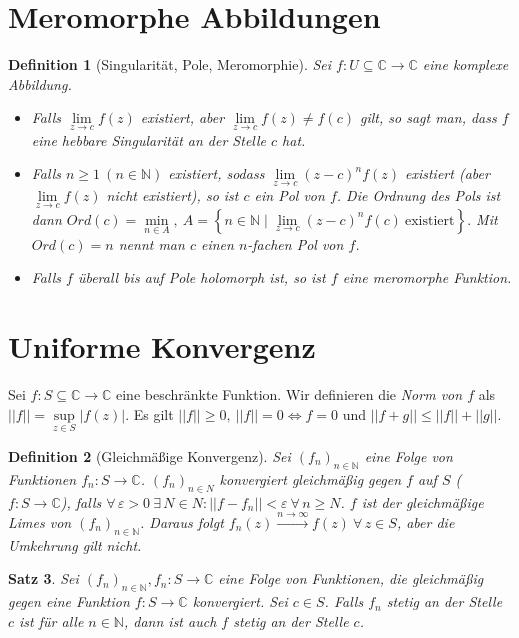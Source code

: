 \documentclass[a4paper,12pt]{book}
\renewcommand{\epsilon}{\varepsilon}
\theoremstyle{newthm}
\newtheorem{thm}{Satz}[section]
\theoremstyle{newdef}
\newtheorem{defn}[thm]{Definition}
\theoremstyle{newrem}
\newcommand{\N}{\mathbb{N}}
\newcommand{\C}{\mathbb{C}}
\begin{document}
	
	\section{Meromorphe Abbildungen}
		
		\begin{defn}[Singularität, Pole, Meromorphie]
			Sei $ f : U \subseteq \C \to \C $ eine komplexe Abbildung.
			\begin{itemize}
				\item Falls $ \lim\limits_{z \to c} f(z) $ existiert, aber $ \lim\limits_{z \to c} f(z) \neq f(c) $ gilt, so sagt man, dass $f$ eine \emph{hebbare Singularität} an der Stelle $c$ hat. 
				\item Falls $ n \geq 1\ (n \in \N) $ existiert, sodass $ \lim\limits_{z \to c} (z-c)^n f(z) $ existiert (aber $ \lim\limits_{z \to c} f(z) $ nicht existiert), so ist $c$ ein \emph{Pol} von $f$. Die \emph{Ordnung des Pols} ist dann $ Ord(c) = \min\limits_{n \in A},\ A = \left\{ n \in \N \mid \lim\limits_{z \to c}(z-c)^nf(c)\ \text{existiert} \right\}. $ Mit $ Ord(c) = n $ nennt man $c$ einen $n$-fachen Pol von $f$.
				\item Falls $ f $ überall bis auf Pole holomorph ist, so ist $f$ eine \emph{meromorphe Funktion}.
			\end{itemize}
		\end{defn}
		
	
	\section{Uniforme Konvergenz}
		
		Sei $ f: S \subseteq \C \to \C $ eine beschränkte Funktion. Wir definieren die \emph{Norm von $f$} als $ ||f||=\sup\limits_{z \in S} |f(z)| $. Es gilt $ ||f|| \geq 0,\ ||f||=0 \iff f=0 $ und $ ||f+g|| \leq ||f||+||g|| $. 
		
		\begin{defn}[Gleichmäßige Konvergenz]
			Sei $ (f_n)_{n \in \N} $ eine Folge von Funktionen $ f_n: S \to \C $. $ (f_n)_{n \in N} $ \emph{konvergiert gleichmäßig} gegen $f$ auf $S$ ($ f: S \to \C $), falls $ \forall\, \epsilon > 0 \ \exists\, N \in N: ||f-f_n|| < \epsilon \ \forall\, n \geq N $. $f$ ist der gleichmäßige Limes von $ (f_n)_{n \in \N} $. Daraus folgt $ f_n(z) \overset{n \to \infty}{\longrightarrow} f(z) \ \forall\, z \in S $, aber die Umkehrung gilt nicht.
		\end{defn}
		
		\begin{thm}
			Sei $ (f_n)_{n \in \N}, f_n:S \to \C $ eine Folge von Funktionen, die gleichmäßig gegen eine Funktion $ f: S \to \C $ konvergiert. Sei $c \in S$. Falls $ f_n $ stetig an der Stelle $c$ ist für alle $n \in \N$, dann ist auch $f$ stetig an der Stelle $c$. 
		\end{thm}
		
\end{document}
